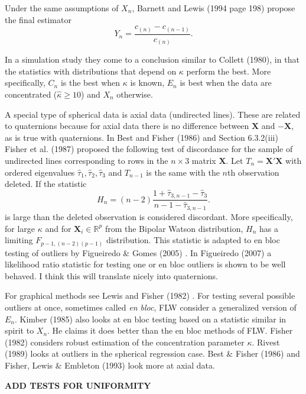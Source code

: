 \documentclass{article}\usepackage[]{graphicx}\usepackage[]{color}
\newcommand{\R}{{\mathbb{R}}}
\begin{document}
Under the same assumptions of $X_n$, Barnett and Lewis (1994 page 198) propose the final estimator
\[
Y_n=\frac{c_{(n)}-c_{(n-1)}}{c_{(n)}}.
\]

In a simulation study they come to a conclusion similar to Collett (1980), in that the statistics with distributions that depend on $\kappa$ perform the best.  More specifically, $C_n$ is the best when $\kappa$ is known, $E_n$ is best when the data are concentrated ($\hat{\kappa}\geq 10$) and $X_n$ otherwise.

A special type of spherical data is axial data (undirected lines).  These are related to quaternions because for axial data there is no difference between $\bm X$ and $-\bm X$, as is true with quaternions.  In Best and Fisher (1986) \cite{best1986} and Section 6.3.2(iii) Fisher et al. (1987) \cite{fisher1987} proposed the following test of discordance for the sample of undirected lines corresponding to rows in the $n\times 3$ matrix $\bm X$.  Let $T_n=\bm X'\bm X$ with ordered eigenvalues $\hat\tau_1,\hat\tau_2,\hat\tau_3$ and $T_{n-1}$ is the same with the $n$th observation deleted.  If the statistic
\[
H_n=(n-2)\frac{1+\hat\tau_{3,n-1}-\hat\tau_3}{n-1-\hat\tau_{3,n-1}}.
\]
is large than the deleted observation is considered discordant.  More specifically, for large $\kappa$ and for $\bm X_i\in \R^p$ from the Bipolar Watson distribution, $H_n$ has a limiting $F_{p-1,(n-2)(p-1)}$ distribution.  This statistic is adapted to en bloc testing of outliers by Figueiredo \& Gomes (2005) \cite{figueiredo2005}.  In Figueiredo (2007) \cite{figueiredo2007} a likelihood ratio statistic for testing one or en bloc outliers is shown to be well behaved.  I think this will translate nicely into quaternions.




For graphical methods see Lewis and Fisher (1982) \cite{lewis1982}.  For testing several possible outliers at once, sometimes called {\it en bloc}, FLW \cite{fisher1981} consider a generalized version of $E_n$.  Kimber (1985) \cite{kimber1985} also looks at en bloc testing based on a statistic similar in spirit to $X_n$.  He claims it does better than the en bloc methods of FLW.  Fisher (1982) \cite{fisher1982} considers robust estimation of the concentration parameter $\kappa$.  Rivest (1989) \cite{rivest1989} looks at outliers in the spherical regression case.  Best \& Fisher (1986) \cite{best1986} and Fisher, Lewis \& Embleton (1993) \cite{fisher1987} look more at axial data.

{\bf ADD TESTS FOR UNIFORMITY}
\end{document}
